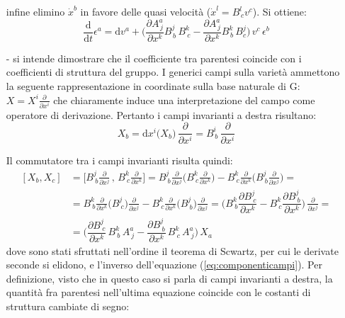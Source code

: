 \begin{itemize}
infine elimino $\dot{x}^{b}$ in favore delle quasi velocità ($\dot{x}^{l} = B^{l}_{\,c} v^{c}$). Si ottiene:
\begin{displaymath}
\dfrac{\textrm{d}}{\textrm{d}t} \epsilon^{a} = \textrm{d}v^{a} + \Bigr( \dfrac{ \partial A^{a}_{\,j}}{\partial x^{k}} B^{j}_{\,b}\,B^{k}_{\:c} -
\dfrac{\partial A^{a}_{\,j}}{\partial x^{k}} B^{k}_{\,b}\,B^{j}_{c} \Bigr)\, v^{c} \, \epsilon^{b}
\end{displaymath}

\item[-] si intende dimostrare che il coefficiente tra parentesi coincide con i coefficienti di struttura del gruppo.
I generici campi sulla varietà ammettono la seguente rappresentazione in coordinate sulla base naturale di G: $X = X^{i} \frac{\partial}{\partial x^{i}} $
che chiaramente induce una interpretazione del campo come operatore di derivazione.
Pertanto i campi invarianti a destra risultano:
\begin{equation}\label{eq:componenticampi}
X_{b} = \textrm{d}x^{i}\bigr(X_{b} \bigr)\, \frac{\partial}{\partial x^{i}} = B^{i}_{\, b}\, \frac{\partial}{\partial x^{i}}
\end{equation}

Il commutatore tra i campi invarianti risulta quindi:
\begin{displaymath}\begin{split}
[ X_{b} , X_{c} ] &= \bigr[ B^{j}_{\: b} \frac{\partial}{\partial x^{j}} \,,\, B^{k}_{\: c} \frac{\partial}{\partial x^{k}} \bigr] = B^{j}_{\: b} \frac{\partial}{\partial x^{j}} \bigr( B^{k}_{\: c} \frac{\partial}{\partial x^{k}} \bigr) - B^{k}_{\: c} \frac{\partial}{\partial x^{k}} \bigr( B^{j}_{\: b} \frac{\partial}{\partial x^{j}} \bigr) = \\ &= B^{k}_{\: b} \frac{\partial}{\partial x^{k}} \bigr( B^{j}_{\: c}  \bigr) \frac{\partial}{\partial x^{j}} - B^{k}_{\: c} \frac{\partial}{\partial x^{k}} \bigr( B^{j}_{\: b} \bigr)  \frac{\partial}{\partial x^{j}}  = \bigr( B^{k}_{\: b} \dfrac{\partial B^{j}_{\: c}}{\partial x^{k}} - B^{k}_{\: c} \dfrac{\partial B^{j}_{\: b}}{\partial x^{k}} \bigr) \, \frac{\partial}{\partial x^{j}} = \\ &=
\Bigr( \dfrac{\partial B^{j}_{\: c}}{\partial x^{k}}\, B^{k}_{\: b} \, A^{a}_{\: j} - \dfrac{\partial B^{j}_{\: b}}{\partial x^{k}}\, B^{k}_{\: c} \, A^{a}_{\: j} \Bigr)\, X_{a}  
\end{split}\end{displaymath}
dove sono stati sfruttati nell'ordine il teorema di Scwartz, per cui le derivate seconde si elidono, e l'inverso dell'equazione (\ref{eq:componenticampi}).
Per definizione, visto che in questo caso si parla di campi invarianti a destra, la quantità fra parentesi nell'ultima equazione coincide con le costanti di struttura cambiate di segno:


\end{itemize}
